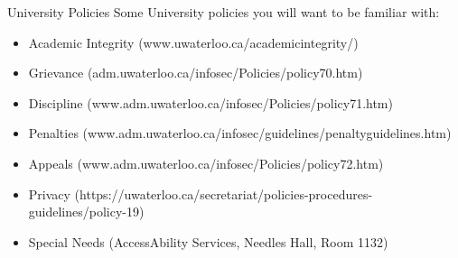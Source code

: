 \documentclass[aspectratio=169]{beamer}
\begin{document}
	\begin{frame}{University Policies}
		Some University policies you will want to be familiar with:
		\vspace{1em}
		\begin{itemize}
			\setlength\itemsep{0.75em}
			\item \normalsize{Academic Integrity} \tiny{(www.uwaterloo.ca/academicintegrity/)}
			\item \normalsize{Grievance} \tiny{(adm.uwaterloo.ca/infosec/Policies/policy70.htm)}
			\item \normalsize{Discipline} \tiny{(www.adm.uwaterloo.ca/infosec/Policies/policy71.htm)}
			\item \normalsize{Penalties} \tiny{(www.adm.uwaterloo.ca/infosec/guidelines/penaltyguidelines.htm)}
			\item \normalsize{Appeals} \tiny{(www.adm.uwaterloo.ca/infosec/Policies/policy72.htm)}
			\item \normalsize{Privacy} \tiny{(https://uwaterloo.ca/secretariat/policies-procedures-guidelines/policy-19)}
			\item \normalsize{Special Needs} \tiny{(AccessAbility Services, Needles Hall, Room 1132)}
		\end{itemize}
	\end{frame}
\end{document}
